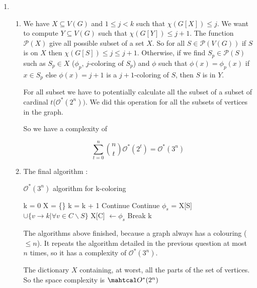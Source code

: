 \documentclass{article}
\theoremstyle{plain}
\begin{document}
\begin{enumerate}
    \newpage
    \item
      \begin{enumerate}
        \item We have $X \subseteq V(G)$ and $1 \leq j < k$ such that
          $\chi(G[X]) \leq j$. We want to compute $Y \subseteq V(G)$ such that
          $\chi(G[Y]) \leq j + 1$. The function $\mathcal P(X)$ give all
          possible subset of a set $X$. So for all $S \in \mathcal P (V(G))$
          if $S$ is on $X$ then $\chi(G[S]) \leq j \leq j + 1$. Otherwise,
          if we find $S_p \in \mathcal P(S)$ such as $S_p \in X$ ($\phi_p$,
          $j$-coloring of $S_p$) and $\phi$ such that $\phi(x) = \phi_p(x)$ if
          $x \in S_p$ else $\phi(x) = j + 1$ is a $j+1$-coloring of $S$, then
          $S$ is in $Y$.

          For all subset we have to potentially calculate all the subset of a
          subset of cardinal $t$($\mathcal O^*(2^n))$. We did this operation
          for all the subsets of vertices in the graph.

          So we have a complexity of

          $$\sum_{t=0}^n \binom n t \mathcal O^*(2^t) = \mathcal O^*(3^n)$$

      \item The final algorithm :

        \begin{algorithm}
          \caption{$\mathcal O^*(3^n)$ algorithm for k-coloring}
          \begin{algorithmic}[1]
              \State k = 0
              \State X = \{\}
                \State k = k + 1
                    \State Continue
                  \EndIf
                    \State Continue
                    \EndIf
                    \State $\phi_s$ = X[S] $\cup \{v \to k| \forall v \in C
                      \backslash S\}$
                      \State X[C] $\leftarrow \phi_s$
                      \State Break
                    \EndIf
                  \EndFor
                \EndFor
              \EndWhile
              \State \Return k
            \EndFunction
          \end{algorithmic}
          \end{algorithm}

          The algorithms above finished, because a graph always has a colouring
          ($\leq n$). It repeats the algorithm detailed in the previous question
          at most $n$ times, so it has a complexity of $\mathcal O^*(3^n)$.

          The dictionary $X$ containing, at worst, all the parts of the set of
          vertices. So the space complexity is $\mahtcal O^*(2^n)$
      \end{enumerate}
  \end{enumerate}
\end{document}
